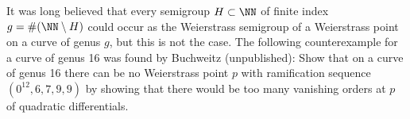 \begin{exercise}[Buchweitz]
It was long believed that every semigroup $H \subset \NN$ of finite index
%
$g = \#(\NN \setminus H)$ could occur as the Weierstrass semigroup of
a Weierstrass
point on a curve of genus $g$, but this is not the case. The following
counterexample for a curve of genus 16 was found by Buchweitz
%
(unpublished): Show that on a curve of genus 16 there can be no
Weierstrass point $p$ with ramification sequence
$(0^{12}, 6,7,9,9)$ by showing that there would be too many vanishing
orders at $p$ of quadratic differentials.
 \end{exercise}


